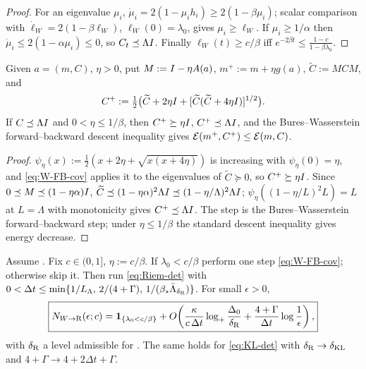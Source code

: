 \begin{proof}
For an eigenvalue $\mu_i$, $\dot\mu_i=2(1-\mu_ih_i)\geq2(1-\beta\mu_i)$; scalar comparison with
$\dot\ell_W=2(1-\beta\ell_W)$, $\ell_W(0)=\lambda_0$, gives $\mu_i\geq\ell_W$. If $\mu_i\geq1/\alpha$
then $\dot\mu_i\leq2(1-\alpha\mu_i)\leq0$, so $C_t\preceq\Lambda I$. Finally $\ell_W(t)\geq c/\beta$
iff $e^{-2\beta t}\leq\tfrac{1-c}{1-\beta\lambda_0}$.
\end{proof}

\begin{lemma}
\label{lem:one-step-W}
Given $a=(m,C)$, $\eta>0$, put $M:=I-\eta A(a)$, $m^+:=m+\eta g(a)$, $\widetilde C:=MCM$, and
\begin{equation}
\label{eq:W-FB-cov}
    C^+:=\tfrac12\bigl(\widetilde C+2\eta I+[\widetilde C(\widetilde C+4\eta I)]^{1/2}\bigr).
\end{equation}
If $C\preceq\Lambda I$ and $0<\eta\leq1/\beta$, then $C^+\succeq\eta I$, $C^+\preceq\Lambda I$, and
the Bures--Wasserstein forward--backward descent inequality gives $\mathcal{E}(m^+,C^+)\leq\mathcal{E}(m,C)$.
\end{lemma}

\begin{proof}
$\psi_\eta(x):=\tfrac12(x+2\eta+\sqrt{x(x+4\eta)})$ is increasing with $\psi_\eta(0)=\eta$, and
\eqref{eq:W-FB-cov} applies it to the eigenvalues of $\widetilde C\succeq0$, so $C^+\succeq\eta I$.
Since $0\preceq M\preceq(1-\eta\alpha)I$, $\widetilde C\preceq(1-\eta\alpha)^2\Lambda I\preceq(1-\eta/\Lambda)^2\Lambda I$;
$\psi_\eta((1-\eta/L)^2L)=L$ at $L=\Lambda$ with monotonicity gives $C^+\preceq\Lambda I$. The step
is the Bures--Wasserstein forward--backward step; under $\eta\leq1/\beta$ the standard descent
inequality \citep{diao2023forward} gives energy decrease.
\end{proof}

\begin{theorem}
\label{thm:disc-W-to-FR}
Assume . Fix $c\in(0,1]$, $\eta:=c/\beta$. If $\lambda_0<c/\beta$
perform one step \eqref{eq:W-FB-cov}; otherwise skip it. Then run \eqref{eq:Riem-det} with
$0<\Delta t\leq\min\{1/L_\Lambda,\,2/(4+\Gamma),\,1/(\beta_\star\bar\Lambda_{\delta_{\mathrm{R}}})\}$. For small
$\epsilon>0$,
\[
    \boxed{
    N_{W\to\mathrm{R}}(\epsilon;c)
    =\mathbf 1_{\{\lambda_0<c/\beta\}}
    +O\!\left(\frac\kappa{c\,\Delta t}\log_+\frac{\Delta_0}{\delta_{\mathrm{R}}}+\frac{4+\Gamma}{\Delta t}\log\frac1\epsilon\right),
    }
\]
with $\delta_{\mathrm{R}}$ a level admissible for . The same holds for
\eqref{eq:KL-det} with $\delta_{\mathrm{R}}\to\delta_{\mathrm{KL}}$ and $4+\Gamma\to4+2\Delta t+\Gamma$.
\end{theorem}


